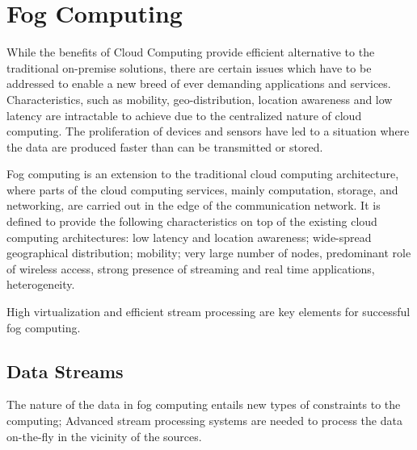 \section{Fog Computing}
\label{section:fog-computing}




While the benefits of Cloud Computing provide efficient alternative to the traditional on-premise solutions, there are certain issues which have to be addressed to enable a new breed of ever demanding applications and services. Characteristics, such as mobility, geo-distribution, location awareness and low latency are intractable to achieve due to the centralized nature of cloud computing. The proliferation of devices and sensors have led to a situation where the data are produced faster than can be transmitted or stored.~\cite{Bonomi:2012:Fog, Vaquero:2014:FYW}

Fog computing is an extension to the traditional cloud computing architecture, where parts of the cloud computing services, mainly computation, storage, and networking, are carried out in the edge of the communication network. It is defined to provide the following characteristics on top of the existing cloud computing architectures: low latency and location awareness; wide-spread geographical distribution; mobility; very large number of nodes, predominant role of wireless access, strong presence of streaming and real time applications, heterogeneity.~\cite{Bonomi:2012:Fog}

High virtualization and efficient stream processing are key elements for successful fog computing.

\subsection{Data Streams}
The nature of the data in fog computing entails new types of constraints to the computing; Advanced stream processing systems are needed to process the data on-the-fly in the vicinity of the sources.~\cite{Bonomi:2012:Fog}

